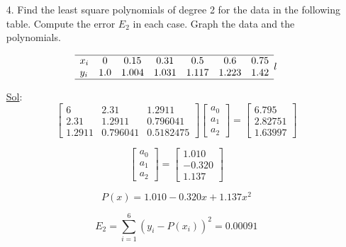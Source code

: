 \begin{enumerate}

  \item[4.] Find the least square polynomials of degree 2 for the
    data in the following table. Compute the error \(E_2\) in each
    case. Graph the data and the polynomials.

    \[
      \begin{array}{lcccccc}
        \hline
        x_i & 0 & 0.15 & 0.31 & 0.5 & 0.6 & 0.75 \\
        y_i & 1.0 & 1.004 & 1.031 & 1.117 & 1.223 & 1.42 \\
        \hline
      \end{array}{l}
    \]

    \underline{Sol}:\\

    \[
      \begin{bmatrix}
        6 & 2.31 & 1.2911 \\
        2.31 & 1.2911 & 0.796041 \\
        1.2911 & 0.796041 & 0.5182475
      \end{bmatrix}
      \begin{bmatrix}
        a_0 \\ a_1 \\ a_2
      \end{bmatrix}
      =
      \begin{bmatrix}
        6.795 \\ 2.82751 \\ 1.63997
      \end{bmatrix}
    \]

    \[
      \begin{bmatrix}
        a_0 \\ a_1 \\ a_2
      \end{bmatrix}
      =
      \begin{bmatrix}
        1.010 \\
        -0.320 \\
        1.137
      \end{bmatrix}
    \]

    \[
      P(x) = 1.010 - 0.320x + 1.137x^2
    \]

    \[
      E_2 = \sum_{i=1}^6 (y_i - P(x_i))^2 = 0.00091
    \]


\end{enumerate}

